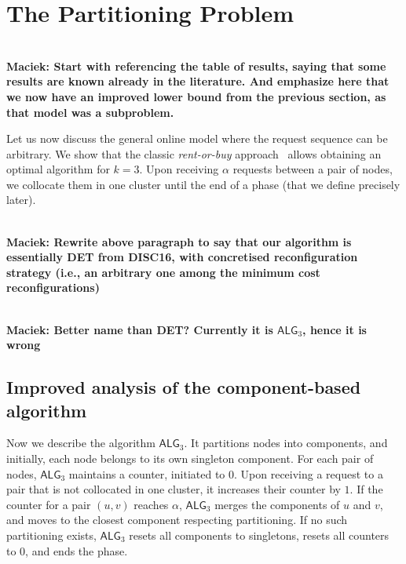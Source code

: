 \documentclass[manuscript,screen=true, review, anonymous]{acmart}
\newcommand{\OPT}{\textsf{OPT}\xspace}
\newcommand{\OBRP}{BRP}
\newcommand{\TAlg}{{\ensuremath{\textsf{ALG}_{3}}}\xspace}
\newcommand\maciek[1]{\color{brown}\textbf{\\ Maciek: #1}\color{black}}
\begin{document}

\section{The Partitioning Problem}
\label{sec:part}



\maciek{Start with referencing the table of results, saying that some results are known already in the literature. And emphasize here that we now have an improved lower bound from the previous section, as that model was a subproblem.}

Let us now discuss the general online
model where the request sequence
can be arbitrary.
We show that the classic \emph{rent-or-buy} approach~\cite{karlin-ski-rental} allows obtaining an optimal algorithm for $k=3$.
Upon receiving $\alpha$ requests between a pair of nodes, we collocate them in one cluster until the end of a phase (that we define precisely later).

\maciek{Rewrite above paragraph to say that our algorithm is essentially DET from DISC16, with concretised reconfiguration strategy (i.e., an arbitrary one among the minimum cost reconfigurations)}

\maciek{Better name than DET? Currently it is \TAlg, hence it is wrong}

\subsection{Improved analysis of the component-based algorithm}
\label{sec:k3}


Now we describe the algorithm \TAlg.
It partitions nodes into components, and
initially, each node belongs to its own singleton component.
For each pair of nodes, \TAlg maintains a counter, initiated to $0$. 
Upon receiving a request to a pair that is not collocated in one cluster, it increases their counter by $1$.
If the counter for a pair $(u,v)$ reaches $\alpha$, \TAlg merges the components of $u$ and $v$, and moves to the closest component respecting partitioning.
If no such partitioning exists, \TAlg resets all components to singletons, resets all counters to $0$, and ends the phase.
\end{document}
